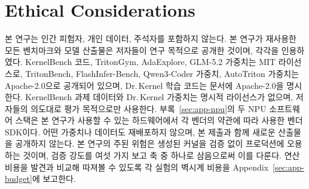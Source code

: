 \documentclass[11pt]{article}
\begin{document}
\section*{Ethical Considerations}

본 연구는 인간 피험자, 개인 데이터, 주석자를 포함하지 않는다. 본 연구가 재사용한 모든 벤치마크와
모델 산출물은 저자들이 연구 목적으로 공개한 것이며, 각각을 인용하였다. KernelBench 코드, TritonGym,
AdaExplore, GLM-5.2 가중치는 MIT 라이선스로, TritonBench, FlashInfer-Bench, Qwen3-Coder 가중치,
AutoTriton 가중치는 Apache-2.0으로 공개되어 있으며, Dr.\,Kernel 학습 코드는 문서에 Apache-2.0을
명시한다. KernelBench 과제 데이터와 Dr.\,Kernel 가중치는 명시적 라이선스가 없으며, 저자들의 의도대로
평가 목적으로만 사용한다. 부록~\ref{sec:app-npu}의 두 NPU 소프트웨어 스택은 본 연구가 사용할 수 있는
하드웨어에서 각 벤더의 약관에 따라 사용한 벤더 SDK이다. 어떤 가중치나 데이터도 재배포하지 않으며, 본 제출과 함께 새로운 산출물을
공개하지 않는다. 본 연구의 주된 위험은 생성된 커널을 검증 없이 프로덕션에 오용하는 것이며, 검증 강도를
여섯 가지 보고 축 중 하나로 삼음으로써 이를 다룬다.
연산 비용을 발견과 비교해 따져볼 수 있도록 각 실험의 벽시계 비용을 Appendix~\ref{sec:app-budget}에
보고한다.



\appendix

\end{document}
